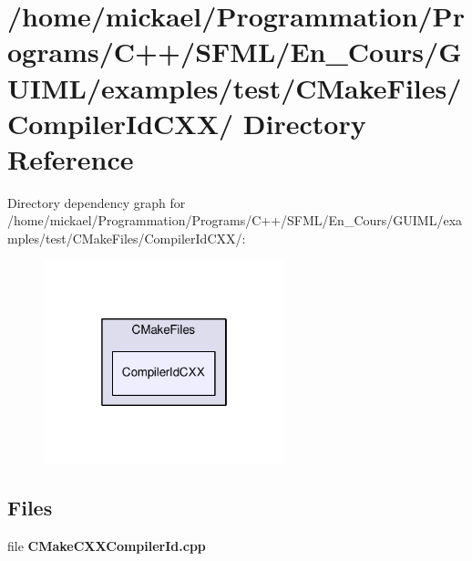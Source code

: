 \section{/home/mickael/\-Programmation/\-Programs/\-C++/\-S\-F\-M\-L/\-En\-\_\-\-Cours/\-G\-U\-I\-M\-L/examples/test/\-C\-Make\-Files/\-Compiler\-Id\-C\-X\-X/ Directory Reference}
\label{dir_928eeeb8ac09cc3e3ba76e97e369531b}
Directory dependency graph for /home/mickael/\-Programmation/\-Programs/\-C++/\-S\-F\-M\-L/\-En\-\_\-\-Cours/\-G\-U\-I\-M\-L/examples/test/\-C\-Make\-Files/\-Compiler\-Id\-C\-X\-X/\-:\nopagebreak
\begin{figure}[H]
\begin{center}
\leavevmode
\includegraphics[width=198pt]{dir_928eeeb8ac09cc3e3ba76e97e369531b_dep}
\end{center}
\end{figure}
\subsection*{Files}
\begin{DoxyCompactItemize}
\item 
file {\bfseries C\-Make\-C\-X\-X\-Compiler\-Id.\-cpp}
\end{DoxyCompactItemize}
